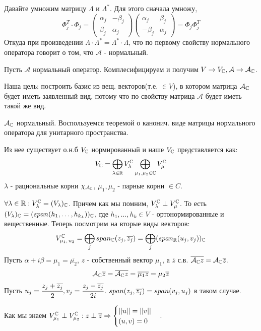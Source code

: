 Давайте умножим матрицу $\Lambda$ и $\Lambda^*$. Для этого сначала умножу, $$\Phi_j^T \cdot \Phi_j = \begin{pmatrix}
    \alpha_j &-\beta_j\\
    \beta_j & \alpha_j
\end{pmatrix} \begin{pmatrix}
    \alpha_j & \beta_j \\
    -\beta_j & \alpha_j
\end{pmatrix} = \Phi_j \Phi_j^T$$ Откуда при произведении $\Lambda \cdot \Lambda^* = \Lambda^* \cdot \Lambda$, что по первому свойству нормального оператора говорит о том, что $\mathcal{A}$ - нормальный.


Пусть $\mathcal{A}$ нормальный оператор. Комплесифицируем и получим $V \rightarrow{} V_{\mathbb{C}}, \mathcal{A}\rightarrow{} \mathcal{A}_{\mathbb{C}}$.  

Наша цель: построить базис из вещ. векторов(т.е. $\in V$), в котором матрица $\mathcal{A}_{\mathbb{C}}$ будет иметь заявленный вид, потому что по свойству матрица $\mathcal{A}$ будет иметь такой же вид.

$\mathcal{A}_{\mathbb{C}}$ нормальный. Воспользуемся теоремой о канонич. виде матрицы нормального оператора для унитарного пространства.

Из нее существует о.н.б $V_{\mathbb{C}}$ нормированный и наше $V_{\mathbb{C}}$ представляется как:
$$V_{\mathbb{C}} = \bigoplus\limits_{\lambda \in \mathbb{R}} V_\lambda^{\mathbb{C}}\bigoplus\limits_{\mu_1,\mu_2 \in \mathbb{C}}V_\mu^{\mathbb{C}}$$
$\lambda$ - рациональные корни $\chi_{\mathcal{A}_{\mathbb{C}}}$, $\mu_1,\mu_2$ - парные корни $\in C$.

$\forall \lambda \in \mathbb{R}: V_\lambda^{\mathbb{C}} = (V_\lambda)_{\mathbb{C}}$. Причем как мы помним, $V_\lambda^{\mathbb{C}} \perp V_\mu^{\mathbb{C}}$. То есть $(V_\lambda)_{\mathbb{C}} = (span(h_1,\ldots,h_{k_\lambda}))_{\mathbb{C}}$, где $h_1,\ldots,h_k  \in V$ - ортонормированные и вещественные. Теперь посмотрим на вторые виды векторов:
$$V_{\mu_1,\,u_2}^{\mathbb{C}} = \bigoplus\limits_j span_{\mathbb{C}} (z_j, \overline{z_j}) = \bigoplus\limits_j(span_{\mathbb{R}}(u_j,v_j))_{\mathbb{C}}$$
Пусть $\alpha + i\beta = \mu_1 = \overline{\mu_2}$, $z$ - собственный вектор $\mu_1$, а $\overline{z}$ с.в.  $\overline{\mathcal{A}_{\mathbb{C}} z} = \mathcal{A}_{\mathbb{C}} \overline{z}$.
$$\mathcal{A}_{\mathbb{C}} \overline{z} = \overline{\mathcal{A}_{\mathbb{C}} z} = \overline{\mu_1 z} = \mu_2\overline{z}$$
Пусть $u_j =\cfrac{z_j + \overline{z_j}}{2}, v_j = \cfrac{z_j -\overline{z_j}}{2i}$. $span (z_j, \overline{z_j}) = span(v_j,u_j)$ в таком случае.

Как мы знаем $V_{\mu_1}^{\mathbb{C}}\perp V_{\mu_2}^{\mathbb{C}}: z \perp \overline{z} \Rightarrow \begin{cases}
    ||u || = ||v||\\
    (u,v) = 0
\end{cases}$.

